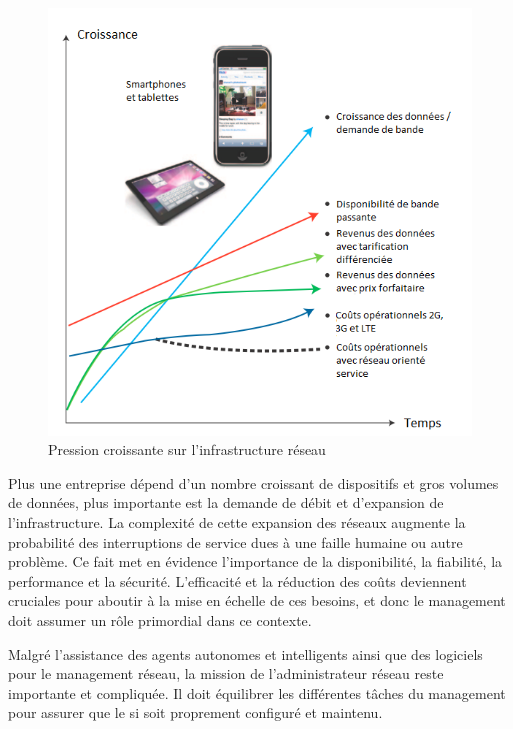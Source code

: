 \begin{figure}[!h] %
\includegraphics[width=15cm]{images/IncreasingPressureOnNetworkInfra2.png} %
\caption{ Pression croissante sur l'infrastructure réseau \cite{IBMManagingGrowingPainsNeed}} %
\label{imgPressure} %
\end{figure} %

Plus une entreprise dépend d'un nombre croissant de dispositifs et gros volumes de données, plus importante est la demande de débit et d'expansion de l'infrastructure. La complexité de cette expansion des réseaux augmente la probabilité des interruptions de service dues à une faille humaine ou autre problème. Ce fait met en évidence l'importance de la disponibilité, la fiabilité, la performance et la sécurité. L'efficacité et la réduction des coûts deviennent cruciales pour aboutir à la mise en échelle de ces besoins, et donc le management doit assumer un rôle primordial dans ce contexte. \cite{IBMManagingGrowingPainsNeed}
 

Malgré l'assistance des agents autonomes et intelligents ainsi que des logiciels pour le management réseau, la mission de l'administrateur réseau reste importante et compliquée. Il doit équilibrer les différentes tâches du management pour assurer que le \gls{si} soit proprement configuré et maintenu. \cite{CentralIssuesNetworkManagementConclusion}

